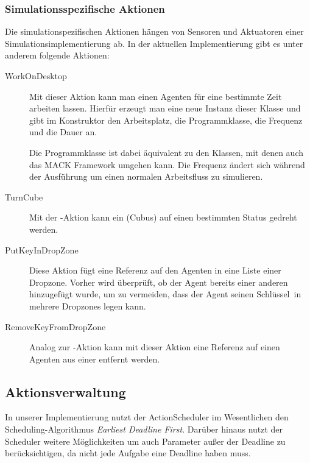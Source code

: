 \subsubsection{Simulationsspezifische Aktionen}
Die simulationspezifischen Aktionen hängen von Sensoren und Aktuatoren einer Simulationsimplementierung ab. In der aktuellen Implementierung gibt es unter anderem folgende Aktionen:
\begin{description}
	\item[WorkOnDesktop] Mit dieser Aktion kann man einen Agenten für eine bestimmte Zeit arbeiten lassen. Hierfür erzeugt man eine neue Instanz dieser Klasse und gibt im Konstruktor den Arbeitsplatz, die Programmklasse, die Frequenz und die Dauer an.
	
	Die Programmklasse ist dabei äquivalent zu den Klassen, mit denen auch das MACK Framework umgehen kann. Die Frequenz ändert sich während der Ausführung um einen normalen Arbeitsfluss zu simulieren.
	\item[TurnCube] Mit der -Aktion kann ein  (Cubus) auf einen bestimmten Status gedreht werden.
	\item[PutKeyInDropZone] Diese Aktion fügt eine Referenz auf den Agenten in eine Liste einer Dropzone. Vorher wird überprüft, ob der Agent bereits einer anderen  hinzugefügt wurde, um zu vermeiden, dass der Agent seinen \glqq Schlüssel\grqq\ in mehrere Dropzones legen kann.
	\item[RemoveKeyFromDropZone] Analog zur -Aktion kann mit dieser Aktion eine Referenz auf einen Agenten aus einer  entfernt werden.
\end{description}

\subsection{Aktionsverwaltung}\label{subsec:real_actionhandling}
In unserer Implementierung nutzt der ActionScheduler im Wesentlichen den Scheduling-Algorithmus \emph{Earliest Deadline First}. Darüber hinaus nutzt der Scheduler weitere Möglichkeiten um auch Parameter außer der Deadline zu berücksichtigen, da nicht jede Aufgabe eine Deadline haben muss. 


